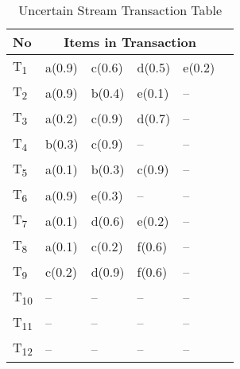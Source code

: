 %
%
\begin{table}[ht]
\centering

\begin{tabular}{|l|l|l|l|l|l|}
\hline
	No & \multicolumn{4}{c|}{Items in Transaction} \\ \hline \hline
	T\textsubscript{1} & a(0.9) & c(0.6) & d(0.5) & e(0.2)			\\\hline
	T\textsubscript{2} & a(0.9) & b(0.4) & e(0.1) & --    			\\\hline
	T\textsubscript{3} & a(0.2) & c(0.9) & d(0.7) & --    			\\\hline
	T\textsubscript{4} & b(0.3) & c(0.9) & -- & --			\\\hline
	T\textsubscript{5} & a(0.1) & b(0.3) & c(0.9) & --    			\\\hline
	T\textsubscript{6} & a(0.9) & e(0.3) & -- & --        			\\\hline
   	T\textsubscript{7} & a(0.1) & d(0.6) & e(0.2) & --		\\\hline
	T\textsubscript{8} & a(0.1) & c(0.2) & f(0.6) & --    			\\\hline
	T\textsubscript{9} & c(0.2) & d(0.9) & f(0.6) & --    			\\\hline
	
	T\textsubscript{10} &  --  &  --  &  --  & --    				\\\hline
	T\textsubscript{11} &  --  &  --  &  --  & --    				\\\hline
	T\textsubscript{12} &  --  &  --  &  --  & --    				\\\hline
	
		
\end{tabular}
\label{tab:ex_u}
\caption{Uncertain Stream Transaction Table}
\label{table:uncertain_stream_transaction}
\end{table}
%